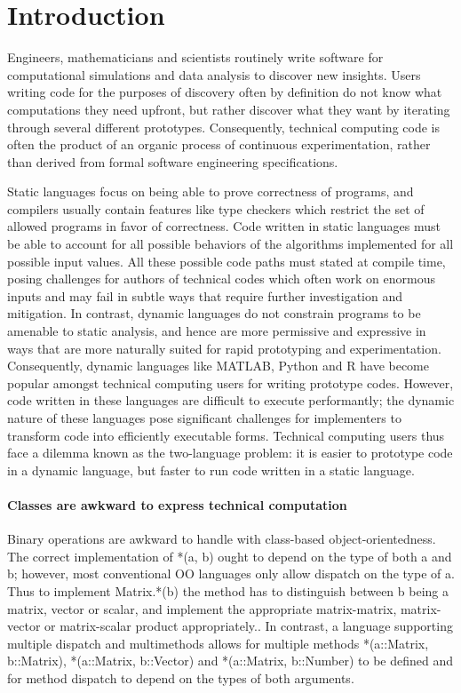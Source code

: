 \documentclass[pldi]{sigplanconf-pldi15}
\begin{document}
\section{Introduction}

Engineers, mathematicians and scientists routinely write software for
computational simulations and data analysis to discover new insights.
Users writing code for the purposes of discovery often by definition do not
know what computations they need upfront, but rather discover what they want by
iterating through several different prototypes. Consequently, technical
computing code is often the product of an organic process of continuous
experimentation, rather than derived from formal software engineering
specifications.

Static languages focus on being able to prove correctness of programs, and
compilers usually contain features like type checkers which restrict the set of
allowed programs in favor of correctness. Code written in static languages
must be able to account for all possible behaviors of the algorithms
implemented for all possible input values. All these possible code paths must
stated at compile time, posing challenges for authors of technical codes which
often work on enormous inputs and may fail in subtle ways that require further
investigation and mitigation. In contrast, dynamic languages do not constrain
programs to be amenable to static analysis, and hence are more permissive and
expressive in ways that are more naturally suited for rapid prototyping and
experimentation. Consequently, dynamic languages like MATLAB, Python and R have
become popular amongst technical computing users for writing prototype codes.
However, code written in these languages are difficult to execute performantly;
the dynamic nature of these languages pose significant challenges for
implementers to transform code into efficiently executable forms. Technical
computing users thus face a dilemma known as the two-language problem: it is
easier to prototype code in a dynamic language, but faster to run code written in
a static language. 

\paragraph{Classes are awkward to express technical computation}
Binary operations are awkward to handle with class-based object-orientedness.
The correct implementation of *(a, b) ought to depend on the type of both a and
b; however, most conventional OO languages only allow dispatch on the type of
a. Thus to implement Matrix.*(b) the method has to distinguish between b being
a matrix, vector or scalar, and implement the appropriate matrix-matrix,
matrix-vector or matrix-scalar product appropriately.. In contrast, a language
supporting multiple dispatch and multimethods allows for multiple methods
*(a::Matrix, b::Matrix), *(a::Matrix, b::Vector) and *(a::Matrix, b::Number) to
be defined and for method dispatch to depend on the types of both arguments.
\end{document}

